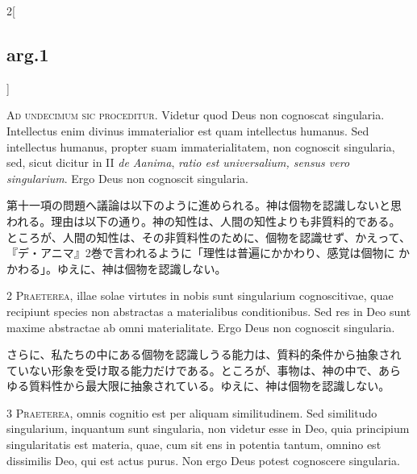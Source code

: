 \documentclass[paper=a4paper,fontsize=10pt,jafontsize=9pt,titlepage]{jlreq}
\begin{document}
\begin{paracol}{2}[\subsection{arg.1}]

{\huge A}{\scshape d undecimum sic proceditur}. Videtur quod Deus non
cognoscat singularia. Intellectus enim divinus immaterialior est quam
intellectus humanus. Sed intellectus humanus, propter suam
immaterialitatem, non cognoscit singularia, sed, sicut dicitur in II
{\itshape de Aanima}, {\itshape ratio est universalium, sensus vero
singularium}. Ergo Deus non cognoscit singularia.

\switchcolumn

第十一項の問題へ議論は以下のように進められる。神は個物を認識しないと思
われる。理由は以下の通り。神の知性は、人間の知性よりも非質料的である。
ところが、人間の知性は、その非質料性のために、個物を認識せず、かえって、
『デ・アニマ』2巻で言われるように「理性は普遍にかかわり、感覚は個物に
かかわる」。ゆえに、神は個物を認識しない。


{\scshape 2 Praeterea}, illae solae virtutes in nobis sunt singularium
cognoscitivae, quae recipiunt species non abstractas a materialibus
conditionibus. Sed res in Deo sunt maxime abstractae ab omni
materialitate. Ergo Deus non cognoscit singularia.

\switchcolumn

さらに、私たちの中にある個物を認識しうる能力は、質料的条件から抽象され
ていない形象を受け取る能力だけである。ところが、事物は、神の中で、あら
ゆる質料性から最大限に抽象されている。ゆえに、神は個物を認識しない。


{\scshape 3 Praeterea}, omnis cognitio est per aliquam
similitudinem. Sed similitudo singularium, inquantum sunt singularia,
non videtur esse in Deo, quia principium singularitatis est materia,
quae, cum sit ens in potentia tantum, omnino est dissimilis Deo, qui
est actus purus. Non ergo Deus potest cognoscere singularia.

\switchcolumn


\end{paracol}
\end{document}
